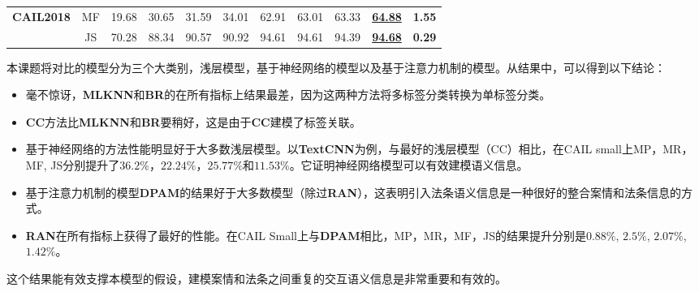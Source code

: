 \begin{table}[htbp]
\begin{tabular}{@{}c|c|cccc|cc|c|c|c@{}}
        \textbf{CAIL2018}                 & MF                               & 19.68                    & 30.65                    & 31.59                   & 34.01                   & 62.91                                                     & 63.01                                                    & 63.33                                                                                      & \underline{\textbf{64.88}}                                                               & \textbf{1.55}                     \\
                                          & JS                                & 70.28                    & 88.34                    & 90.57                   & 90.92                   & 94.61                                                     & 94.61                                                    & 94.39                                                                                      & \underline{\textbf{94.68}}                                                                & \textbf{0.29}                     \\ \bottomrule
        \end{tabular}
\end{table}
本课题将对比的模型分为三个大类别，浅层模型，基于神经网络的模型以及基于注意力机制的模型。从结果中，可以得到以下结论：
\begin{itemize}
    \item 毫不惊讶，\textbf{MLKNN}和\textbf{BR}的在所有指标上结果最差，因为这两种方法将多标签分类转换为单标签分类。
    \item \textbf{CC}方法比\textbf{MLKNN}和\textbf{BR}要稍好，这是由于\textbf{CC}建模了标签关联。
    \item 基于神经网络的方法性能明显好于大多数浅层模型。以\textbf{TextCNN}为例，与最好的浅层模型（CC）相比，在CAIL small上MP，MR，MF, JS分别提升了$36.2\%$，$22.24\%$，$25.77\%$和$11.53\%$。它证明神经网络模型可以有效建模语义信息。
    \item 基于注意力机制的模型\textbf{DPAM}的结果好于大多数模型（除过\textbf{RAN}），这表明引入法条语义信息是一种很好的整合案情和法条信息的方式。
    \item \textbf{RAN}在所有指标上获得了最好的性能。在CAIL Small上与\textbf{DPAM}相比，MP，MR，MF，JS的结果提升分别是$0.88\%$, $2.5\%$, $2.07\%$, $1.42\%$。
\end{itemize}

这个结果能有效支撑本模型的假设，建模案情和法条之间重复的交互语义信息是非常重要和有效的。

